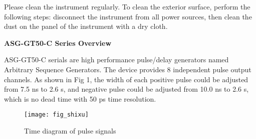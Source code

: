 \vspace{0.7cm}

\vspace{0.2cm}
\hspace{-0.2cm}Please clean the instrument regularly. To clean the exterior surface, perform the following steps: disconnect the instrument from all power sources, then clean the dust on the panel of the instrument with a dry cloth.

%

\newpage
\noindent\huge \textbf{ASG-GT50-C Series Overview}
\vspace{0.6cm}

\normalsize ASG-GT50-C serials are high performance pulse/delay generators named Arbitrary Sequence Generators. The device provides 8 independent pulse output channels. As shown in Fig 1, the width of each positive pulse could be adjusted from 7.5 ns to 2.6 s, and negative pulse could be adjusted from 10.0 ns to 2.6 s, which is no dead time with 50 ps time resolution.
\begin{figure}[ht]
\centering
\texttt{[image: fig\_shixu]}
\caption{\hspace{0.2cm}Time diagram of pulse signals}\label{fig:fig1}
\end{figure}
\vspace{0.5cm}

